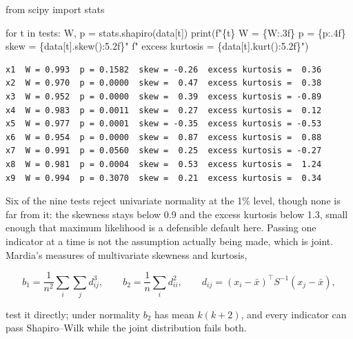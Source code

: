 \documentclass[
  letterpaper,
  10pt,
  twoside,
  openright,
  numbers=noenddot,
  chapterprefix=true]{scrbook}
\newenvironment{Shaded}{}{}
\newcommand{\BuiltInTok}[1]{\textcolor[rgb]{0.84,0.23,0.29}{#1}}
\newcommand{\ControlFlowTok}[1]{\textcolor[rgb]{0.84,0.23,0.29}{#1}}
\newcommand{\ImportTok}[1]{\textcolor[rgb]{0.01,0.18,0.38}{#1}}
\newcommand{\KeywordTok}[1]{\textcolor[rgb]{0.84,0.23,0.29}{#1}}
\newcommand{\NormalTok}[1]{\textcolor[rgb]{0.14,0.16,0.18}{#1}}
\newcommand{\OperatorTok}[1]{\textcolor[rgb]{0.14,0.16,0.18}{#1}}
\newcommand{\SpecialCharTok}[1]{\textcolor[rgb]{0.00,0.36,0.77}{#1}}
\newcommand{\SpecialStringTok}[1]{\textcolor[rgb]{0.01,0.18,0.38}{#1}}
\begin{document}
\label{check-normality}
\begin{Shaded}
\begin{Highlighting}[]
\ImportTok{from}\NormalTok{ scipy }\ImportTok{import}\NormalTok{ stats}

\ControlFlowTok{for}\NormalTok{ t }\KeywordTok{in}\NormalTok{ tests:}
\NormalTok{    W, p }\OperatorTok{=}\NormalTok{ stats.shapiro(data[t])}
    \BuiltInTok{print}\NormalTok{(}\SpecialStringTok{f"}\SpecialCharTok{\{}\NormalTok{t}\SpecialCharTok{\}}\SpecialStringTok{  W = }\SpecialCharTok{\{}\NormalTok{W}\SpecialCharTok{:.3f\}}\SpecialStringTok{  p = }\SpecialCharTok{\{}\NormalTok{p}\SpecialCharTok{:.4f\}}\SpecialStringTok{  skew = }\SpecialCharTok{\{}\NormalTok{data[t]}\SpecialCharTok{.}\NormalTok{skew()}\SpecialCharTok{:5.2f\}}\SpecialStringTok{"}
          \SpecialStringTok{f"  excess kurtosis = }\SpecialCharTok{\{}\NormalTok{data[t]}\SpecialCharTok{.}\NormalTok{kurt()}\SpecialCharTok{:5.2f\}}\SpecialStringTok{"}\NormalTok{)}
\end{Highlighting}
\end{Shaded}

\begin{verbatim}
x1  W = 0.993  p = 0.1582  skew = -0.26  excess kurtosis =  0.36
x2  W = 0.970  p = 0.0000  skew =  0.47  excess kurtosis =  0.38
x3  W = 0.952  p = 0.0000  skew =  0.39  excess kurtosis = -0.89
x4  W = 0.983  p = 0.0011  skew =  0.27  excess kurtosis =  0.12
x5  W = 0.977  p = 0.0001  skew = -0.35  excess kurtosis = -0.53
x6  W = 0.954  p = 0.0000  skew =  0.87  excess kurtosis =  0.88
x7  W = 0.991  p = 0.0560  skew =  0.25  excess kurtosis = -0.27
x8  W = 0.981  p = 0.0004  skew =  0.53  excess kurtosis =  1.24
x9  W = 0.994  p = 0.3070  skew =  0.21  excess kurtosis =  0.34
\end{verbatim}

Six of the nine tests reject univariate normality at the 1\% level,
though none is far from it: the skewness stays below 0.9 and the excess
kurtosis below 1.3, small enough that maximum likelihood is a defensible
default here. Passing one indicator at a time is not the assumption
actually being made, which is joint. Mardia's measures of multivariate
skewness and kurtosis,

\[
b_1 = \frac{1}{n^2}\sum_i \sum_j d_{ij}^3 ,
\qquad
b_2 = \frac{1}{n}\sum_i d_{ii}^2 ,
\qquad
d_{ij} = (x_i - \bar x)^\top S^{-1} (x_j - \bar x),
\]

test it directly; under normality \(b_2\) has mean \(k(k+2)\), and every
indicator can pass Shapiro--Wilk while the joint distribution fails
both.
\end{document}
